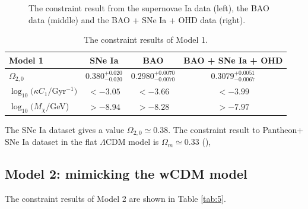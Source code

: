 \documentclass[twocolumn]{aastex631}
\begin{document}
\begin{figure}
{      }
      \caption{The constraint result from the supernovae Ia data
      (left), the BAO data (middle) and the BAO + SNe Ia + OHD data (right).}
      \label{fig:1}
   \end{figure}

   \begin{table}
      \centering
      \begin{tabular}{lccc}
         \hline\hline
         Model 1 & SNe Ia & BAO & BAO + SNe Ia + OHD \\
         \hline
         $\Omega_{2,0}$ & $0.380_{-0.020}^{+0.020}$
          & $0.2980_{-0.0070}^{+0.0070}$ & $0.3079_{-0.0067}^{+0.0051}$ \\
         $\log_{10}(\kappa C_1/$Gyr${}^{-1})$ & $<-3.05$ 
         & $<-3.66$  & $<-3.99$ \\
         $\log_{10}(M_{\chi}/$GeV) & $>-8.94$
         & $>-8.28$ & $>-7.97$ \\
         \hline
      \end{tabular}
      \caption{The constraint results of Model 1.}
      \label{tab:4}
   \end{table}

   The SNe Ia dataset gives a value $\Omega_{2,0} \simeq 0.38$. The constraint result to Pantheon+
   SNe Ia dataset in the flat $\Lambda$CDM model is $\Omega_{m} \simeq 0.33$ (\cite{Borghi_2022}),
   
\subsection{Model 2: mimicking the wCDM model}

   The constraint results of Model 2 are shown in Table \ref{tab:5}.
\end{document}
